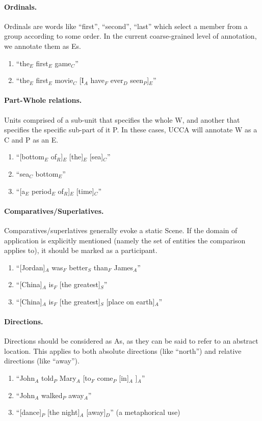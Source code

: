 \documentclass[11pt]{article}
\newcommand{\be}{\begin{enumerate}}
\newcommand{\ee}{\end{enumerate}}
\begin{document}
\paragraph{Ordinals.} Ordinals are words like ``first'', ``second'', ``last'' which select a member from a group according to some order. In the current coarse-grained level of annotation, we annotate them as Es.
\be \item
``the$_E$ first$_E$ game$_C$''
\item
``the$_E$ first$_E$ movie$_C$ [I$_A$ have$_F$ ever$_D$ seen$_P$]$_E$''
\ee

\paragraph{Part-Whole relations.} Units comprised of a sub-unit that specifies the whole W, and another that specifies the specific sub-part of it P. In these cases, UCCA will annotate W as a C and P as an E.
\be
\item
``[bottom$_E$ of$_R$]$_E$ [the]$_E$ [sea]$_C$''
\item
``sea$_C$ bottom$_E$''
\item
``[a$_E$ period$_E$ of$_R$]$_E$ [time]$_C$''
\ee

\paragraph{Comparatives/Superlatives.} Comparatives/superlatives generally evoke a static Scene. If the domain of application is explicitly mentioned (namely the set of entities the comparison applies to), it should be marked as a participant.
\be
\item
``[Jordan]$_A$ was$_F$ better$_S$ than$_F$ James$_A$''
\item
``[China]$_A$ is$_F$ [the greatest]$_S$''
\item
``[China]$_A$ is$_F$ [the greatest]$_S$ [place on earth]$_A$''
\ee

\paragraph{Directions.} Directions should be considered as As, as they can be said to refer to an abstract location. This applies to both absolute directions (like ``north'') and relative directions (like ``away'').
\be
\item
``John$_A$ told$_P$ Mary$_A$ [to$_F$ come$_P$ [in]$_A$ ]$_A$''
\item
``John$_A$ walked$_P$ away$_A$''
\item
``[dance]$_P$ [the night]$_A$ [away]$_D$'' (a metaphorical use)
\ee
\end{document}
